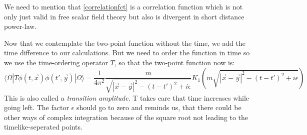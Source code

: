 	We need to mention that \eqref{correlationfct} is a correlation function which is not only just valid in free scalar field theory but also is divergent in short distance power-law. 
	
	Now that we contemplate the two-point function without the time, we add the time difference to our calculations. But we need to order the function in time so we use the time-ordering operator $T$, so that the two-point function now is:
		\begin{equation}
			\langle \Omega| T \phi(t,\vec{x})\phi(t',\vec{y}) |\Omega\rangle=
			\frac{1}{4\pi^2} \frac{m}{\sqrt{|\vec{x}-\vec{y}|^2-(t-t')^2+i\epsilon}}
			K_1 \left( m\sqrt{|\vec{x}-\vec{y}|^2-(t-t')^2+i\epsilon}\right)
		\end{equation} 
	This is also called a \textit{transition amplitude}. T takes care that time increases while going left. The factor $\epsilon$ should go to zero and reminds us, that there could be other ways of complex integration because of the square root not leading to the timelike-seperated points.